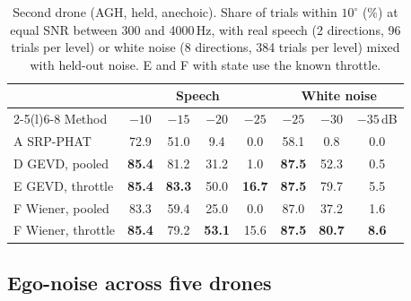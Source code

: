 \begin{table}[t]
\centering
\scriptsize
\setlength{\tabcolsep}{1.6pt}
\begin{tabular}{@{}lccccccc@{}}
\toprule
 & \multicolumn{4}{c}{Speech} & \multicolumn{3}{c}{White noise} \\
\cmidrule(lr){2-5}\cmidrule(l){6-8}
Method & $-10$ & $-15$ & $-20$ & $-25$ & $-25$ & $-30$ & $-35$\,dB \\
\midrule
A\; SRP-PHAT & 72.9 & 51.0 & 9.4 & 0.0 & 58.1 & 0.8 & 0.0 \\
D\; GEVD, pooled & \textbf{85.4} & 81.2 & 31.2 & 1.0 & \textbf{87.5} & 52.3 & 0.5 \\
E\; GEVD, throttle & \textbf{85.4} & \textbf{83.3} & 50.0 & \textbf{16.7} & \textbf{87.5} & 79.7 & 5.5 \\
F\; Wiener, pooled & 83.3 & 59.4 & 25.0 & 0.0 & 87.0 & 37.2 & 1.6 \\
F\; Wiener, throttle & \textbf{85.4} & 79.2 & \textbf{53.1} & 15.6 & \textbf{87.5} & \textbf{80.7} & \textbf{8.6} \\
\bottomrule
\end{tabular}
\caption{Second drone (AGH, held, anechoic). Share of trials within $10^\circ$ (\%) at equal SNR between 300 and 4000\,Hz, with real speech (2 directions, 96 trials per level) or white noise (8 directions, 384 trials per level) mixed with held-out noise. E and F with state use the known throttle.}
\label{tab:agh}
\end{table}


\subsection{Ego-noise across five drones}
\label{sec:case-drones}


